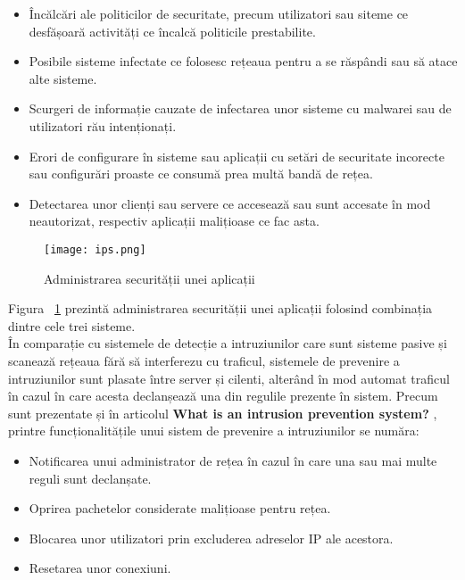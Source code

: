 \begin{itemize}
	\item  Încălcări ale politicilor de securitate, precum utilizatori sau siteme ce desfășoară activități ce încalcă politicile prestabilite. 
	\item  Posibile sisteme infectate ce folosesc rețeaua pentru a se răspândi sau să atace alte sisteme. 
	\item  Scurgeri de informație cauzate de infectarea unor sisteme cu malwarei sau de utilizatori rău intenționați. 
	\item  Erori de configurare în sisteme sau aplicații cu setări de securitate incorecte sau configurări proaste ce consumă prea multă bandă de rețea. 
	\item  Detectarea unor clienți sau servere ce accesează sau sunt accesate în mod neautorizat, respectiv aplicații malițioase ce fac asta. 
\end{itemize}
\begin{figure}[h]
	\centering
	\texttt{[image: ips.png]}
	\caption{ Administrarea securității unei aplicații }
	\label{fig:ips-example}
\end{figure}

Figura ~\ref{fig:ips-example}  prezintă administrarea securității unei aplicații folosind combinația dintre cele trei sisteme.  \\

În comparație cu sistemele de detecție a intruziunilor care sunt sisteme pasive și scanează rețeaua fără să interferezu cu traficul, sistemele de prevenire a intruziunilor sunt plasate între server și cilenti, alterând în mod automat traficul în cazul în care acesta declanșează una din regulile prezente în sistem. Precum sunt prezentate și în articolul  \textbf{What is an intrusion prevention system?} \cite{what_is_ips},  printre funcționalitățile unui sistem de prevenire a intruziunilor se număra:
\begin{itemize}
	\item  Notificarea unui administrator de rețea în cazul în care una sau mai multe reguli sunt declanșate. 
	\item  Oprirea pachetelor considerate malițioase pentru rețea.
	\item  Blocarea unor utilizatori prin excluderea adreselor IP ale acestora. 
	\item  Resetarea unor conexiuni. 
\end{itemize}

